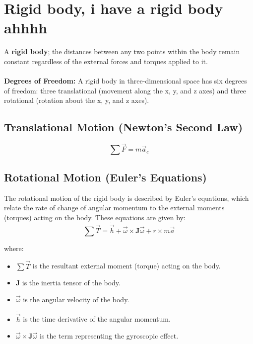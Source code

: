 \section{Rigid body, i have a rigid body ahhhh}
A \textbf{rigid body}; the distances between any two points within the body remain constant regardless of the external forces and torques applied to it.
\\
\\
\textbf{Degrees of Freedom:} A rigid body in three-dimensional space has six degrees of freedom: three translational (movement along the x, y, and z axes) and three rotational (rotation about the x, y, and z axes).

\subsection{Translational Motion (Newton's Second Law)}
\begin{equation}
    \sum \vec{F} = m \vec{a}_c
\end{equation}

\subsection{Rotational Motion (Euler's Equations)}

The rotational motion of the rigid body is described by Euler's equations, which relate the rate of change of angular momentum to the external moments (torques) acting on the body. These equations are given by:
\begin{equation}
    \sum \vec{T} = \dot{\vec{h}} + \vec{\omega} \times \mathbf{J}\vec{\omega} + r \times m\vec{a}
\end{equation}

where:
\begin{itemize}
    \item $\sum \vec{T}$ is the resultant external moment (torque) acting on the body.
    \item \( \mathbf{J} \) is the inertia tensor of the body.
    \item \( \vec{\omega} \) is the angular velocity of the body.
    \item $\dot{\vec{h}}$ is the time derivative of the angular momentum.
    \item \( \vec{\omega} \times \mathbf{J}\vec{\omega} \) is the term representing the gyroscopic effect.
\end{itemize}

